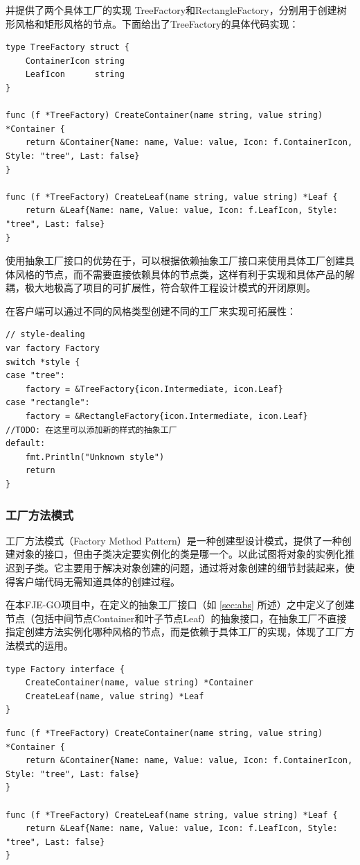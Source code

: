 \documentclass[hyperref,a4paper,UTF8]{ctexart}
\begin{document}
并提供了两个具体工厂的实现 TreeFactory和RectangleFactory，分别用于创建树形风格和矩形风格的节点。下面给出了TreeFactory的具体代码实现：
\begin{lstlisting}
type TreeFactory struct {
	ContainerIcon string
	LeafIcon      string
}

func (f *TreeFactory) CreateContainer(name string, value string) *Container {
	return &Container{Name: name, Value: value, Icon: f.ContainerIcon, Style: "tree", Last: false}
}

func (f *TreeFactory) CreateLeaf(name string, value string) *Leaf {
	return &Leaf{Name: name, Value: value, Icon: f.LeafIcon, Style: "tree", Last: false}
}
\end{lstlisting}

使用抽象工厂接口的优势在于，可以根据依赖抽象工厂接口来使用具体工厂创建具体风格的节点，而不需要直接依赖具体的节点类，这样有利于实现和具体产品的解耦，极大地极高了项目的可扩展性，符合软件工程设计模式的开闭原则。

在客户端可以通过不同的风格类型创建不同的工厂来实现可拓展性：
\begin{lstlisting}
// style-dealing
var factory Factory
switch *style {
case "tree":
    factory = &TreeFactory{icon.Intermediate, icon.Leaf}
case "rectangle":
    factory = &RectangleFactory{icon.Intermediate, icon.Leaf}
//TODO: 在这里可以添加新的样式的抽象工厂
default:
    fmt.Println("Unknown style")
    return
}
\end{lstlisting}


\subsubsection{工厂方法模式}
工厂方法模式（Factory Method Pattern）是一种创建型设计模式，提供了一种创建对象的接口，但由子类决定要实例化的类是哪一个。以此试图将对象的实例化推迟到子类。它主要用于解决对象创建的问题，通过将对象创建的细节封装起来，使得客户端代码无需知道具体的创建过程。

在本FJE-GO项目中，在定义的抽象工厂接口（如 \ref{sec:abs} 所述）之中定义了创建节点（包括中间节点Container和叶子节点Leaf）的抽象接口，在抽象工厂不直接指定创建方法实例化哪种风格的节点，而是依赖于具体工厂的实现，体现了工厂方法模式的运用。
\begin{lstlisting}
type Factory interface {
    CreateContainer(name, value string) *Container
    CreateLeaf(name, value string) *Leaf
}
\end{lstlisting}


\begin{lstlisting}
func (f *TreeFactory) CreateContainer(name string, value string) *Container {
    return &Container{Name: name, Value: value, Icon: f.ContainerIcon, Style: "tree", Last: false}
}

func (f *TreeFactory) CreateLeaf(name string, value string) *Leaf {
    return &Leaf{Name: name, Value: value, Icon: f.LeafIcon, Style: "tree", Last: false}
}
\end{lstlisting}
\end{document}
